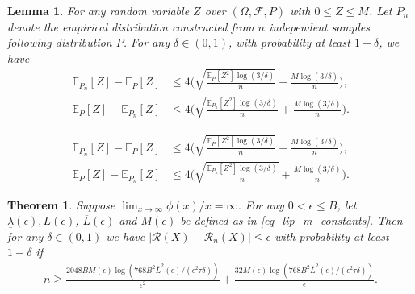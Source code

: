 \documentclass[10pt,a4paper]{amsart}
\newtheorem{lemma}{Lemma}
\newtheorem{theorem}{Theorem}
\newcommand{\EE}{\mathbb{E}}
\newcommand{\abs}[1]{\left\lvert #1 \right\rvert}
\newcommand{\cF}{\mathcal{F}}
\newcommand{\cR}{\mathcal{R}}
\renewcommand{\frac}[2]{\tfrac{#1}{#2}}
\newcommand{\sbr}[1]{\left[#1\right]}
\begin{document}
\begin{lemma}\label{lemma_two_side_bernstein}
For any random variable $Z$ over $(\Omega, \cF, P)$ with $0 \leq Z \leq M$. 
Let $P_n$ denote the empirical distribution constructed from $n$ independent samples following distribution $P$. 
For any $\delta \in (0,1)$, with probability at least $1-\delta$, we have
\begin{align}
{ \EE_{P_n} \sbr{Z}  - \EE_P \sbr{Z} } & \leq  4  \bigg({
\sqrt{\frac{  { \EE_P [{Z^2}]} \log(3/\delta)}{n}} + \frac{M \log(3/\delta)}{n} 
} \bigg),  \label{eq_bernstein_1} \\
{  \EE_P \sbr{Z} - \EE_{P_n} \sbr{Z}   } & \leq  4 \bigg({
\sqrt{\frac{  { \EE_{P_n} [{Z^2}]} \log(3/\delta)}{n}} + \frac{M \log(3/\delta)}{n} 
} \bigg). \label{eq_bernstein_2}
\end{align} 
\end{lemma}

\begin{align}
{ \EE_{P_n} \sbr{Z}  - \EE_P \sbr{Z} } & \leq  4  \bigg({
\sqrt{\frac{  { \EE_P [{Z^2}]} \log(3/\delta)}{n}} + \frac{M \log(3/\delta)}{n} 
} \bigg),   \\
{  \EE_P \sbr{Z} - \EE_{P_n} \sbr{Z}   } & \leq  4 \bigg({
\sqrt{\frac{  { \EE_{P_n} [{Z^2}]} \log(3/\delta)}{n}} + \frac{M \log(3/\delta)}{n} 
} \bigg). 
\end{align} 

\begin{theorem}\label{thrm_sample_bernstein}
Suppose $\lim_{x \to \infty} \phi(x) / x = \infty$. 
For any $0 < \epsilon \leq B $, let 
$\underline{\lambda}(\epsilon), L(\epsilon)$, 
 $\overline{L}(\epsilon)$ and $M(\epsilon)$ be defined as in \eqref{eq_lip_m_constants}.
Then 
for any $\delta \in (0,1)$  
we have $\abs{\cR(X) - \cR_n(X)} \leq \epsilon$ with probability at least $1-\delta$
 if 
\begin{align*}
n \geq 
\frac{2048 B M(\epsilon)  \log (768 B^2 \overline{L}^2(\epsilon)/ (\epsilon^2 \tau \delta))}{\epsilon^2} 
+ 
\frac{32 M(\epsilon)  \log (768 B^2 \overline{L}^2(\epsilon)/ (\epsilon^2 \tau \delta))}{\epsilon} .
\end{align*}
\end{theorem}
\end{document}
